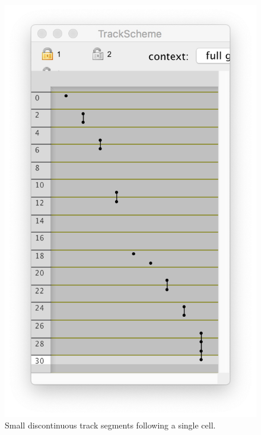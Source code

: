 \begin{figure}
    \includegraphics[height=0.2\textheight]{figures/Mastodon_Tracklets_02.png}
    \hfill\null
    \caption{Small discontinuous track segments following a single cell.}
    \label{fig:StitchedTracklets}
\end{figure}


